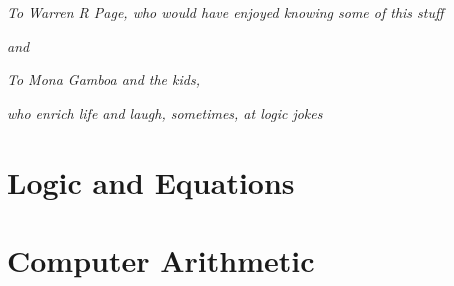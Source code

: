 \documentclass[letterpaper,10pt,extrafontsizesmtwoside,onecolumn,openright,fleqn]{memoir}
\begin{document}
\endgroup

\clearpage

\vspace*{\fill}

\hspace*{15mm}\normalsize\textsf{\emph{To Warren R Page, who would have enjoyed knowing some of this stuff}}\par
\vspace{2mm}
\hspace*{4cm}\normalsize\textsf{\emph{and}}\par
\vspace{2mm}
\hspace*{15mm}\normalsize\textsf{\emph{To Mona Gamboa and the kids,}}\par
\hspace*{46mm}\normalsize\textsf{\emph{who enrich life and laugh, sometimes, at logic jokes}}\par

\vspace*{\fill}

\cleardoublepage

\pagestyle{headings}

\setupshorttoc
\tableofcontents
\clearpage

\setupparasubsecs
\setupmaintoc
\tableofcontents



\clearpage
\listoffigures

\clearpage
\listofasides

\clearpage




\mainmatter

\raggedbottom

\part{Logic and Equations}











\part{Computer Arithmetic}
\end{document}
